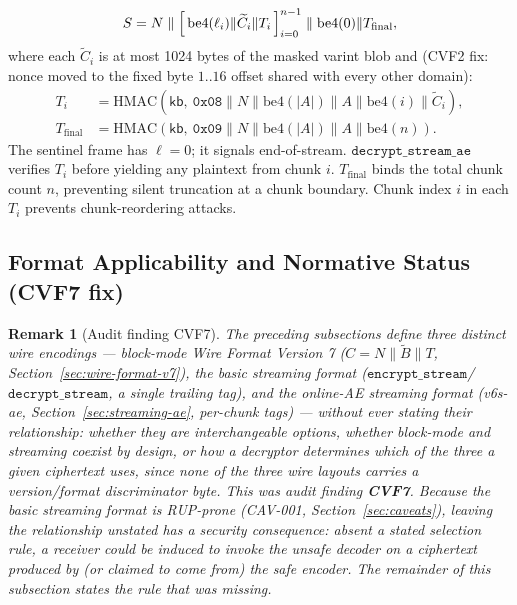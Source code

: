 \documentclass[11pt,a4paper]{article}
\newtheorem{remark}[theorem]{Remark}
\begin{document}
\[
  S = N \;\|\; \Bigl[\,\mathrm{be4}(\ell_i) \| \widetilde{C}_i \| T_i\,\Bigr]_{i=0}^{n-1} \;\|\; \mathrm{be4}(0) \| T_{\mathrm{final}},
\]
where each $\widetilde{C}_i$ is at most 1024 bytes of the masked varint blob and (CVF2
fix: nonce moved to the fixed byte $1..16$ offset shared with every other domain):
\begin{align*}
  T_i &= \mathrm{HMAC}\!\left(\mathsf{kb},\ \texttt{0x08}
          \| N \| \mathrm{be4}(|A|) \| A \| \mathrm{be4}(i) \| \widetilde{C}_i\right), \\
  T_{\mathrm{final}} &= \mathrm{HMAC}\!\left(\mathsf{kb},\ \texttt{0x09}
          \| N \| \mathrm{be4}(|A|) \| A \| \mathrm{be4}(n)\right).
\end{align*}
The sentinel frame has $\ell = 0$; it signals end-of-stream.
$\texttt{decrypt\_stream\_ae}$ verifies $T_i$ before yielding any plaintext from chunk $i$.
$T_{\mathrm{final}}$ binds the total chunk count $n$, preventing silent truncation at a
chunk boundary.  Chunk index $i$ in each $T_i$ prevents chunk-reordering attacks.

\subsection{Format Applicability and Normative Status (CVF7 fix)}
\label{sec:format-applicability}

\begin{remark}[Audit finding CVF7]
The preceding subsections define three distinct wire encodings — block-mode
Wire Format Version 7 ($C = N \| \widetilde{B} \| T$,
Section~\ref{sec:wire-format-v7}), the basic streaming format
($\texttt{encrypt\_stream}$/$\texttt{decrypt\_stream}$, a single trailing
tag), and the online-AE streaming format (v6s-ae,
Section~\ref{sec:streaming-ae}, per-chunk tags) — without ever stating
their relationship: whether they are interchangeable options, whether
block-mode and streaming coexist by design, or how a decryptor determines
which of the three a given ciphertext uses, since none of the three wire
layouts carries a version/format discriminator byte. This was audit finding
\textbf{CVF7}. Because the basic streaming format is RUP-prone (CAV-001,
Section~\ref{sec:caveats}), leaving the relationship unstated has a security
consequence: absent a stated selection rule, a receiver could be induced to
invoke the unsafe decoder on a ciphertext produced by (or claimed to come
from) the safe encoder. The remainder of this subsection states the rule
that was missing.
\end{remark}
\end{document}
